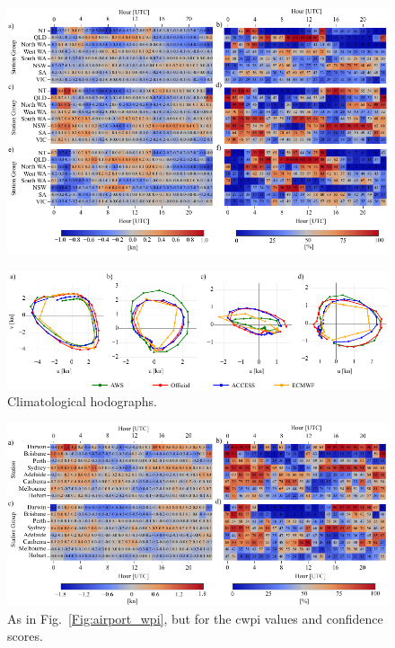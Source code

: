 \documentclass{ametsoc}
\begin{document}
\begin{figure}
\centering
\includegraphics[width=39pc]{cwpi_coastal.pdf}
\label{Fig:cwpi_coastal}
\end{figure}

\begin{figure}
\centering
\includegraphics[width=39pc]{clim_hodo.pdf}
\caption{Climatological hodographs.}
\label{Fig:clim_hodo}
\end{figure}

\begin{figure}
\centering
\includegraphics[width=39pc]{airport_cwpi.pdf}
\caption{As in Fig.~\ref{Fig:airport_wpi}, but for the cwpi values and confidence scores.}
\label{Fig:airport_cwpi}
\end{figure}
\end{document}
